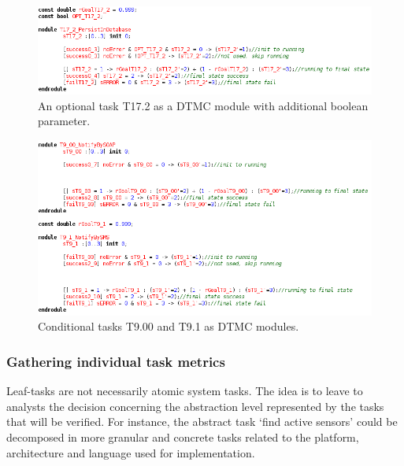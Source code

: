 \begin{figure}[ht]
\centering
\includegraphics[width=1\textwidth]{imgs/PRISM_OPT_TSK.png}
\caption{An optional task T17.2 as a DTMC module with additional boolean parameter.}
\label{fig:PRISM_OPT_TSK}
\end{figure}

\begin{figure}[ht]
\centering
\includegraphics[width=1\textwidth]{imgs/PRISM_TRY_TSKS.png}
\caption{Conditional tasks T9.00 and T9.1 as DTMC modules.}
\label{fig:PRISM_TRY_TSKS}
\end{figure}



\subsubsection{Gathering individual task metrics}

Leaf-tasks are not necessarily atomic system tasks. The idea is to leave to analysts the decision concerning the abstraction level represented by the tasks that will be verified. For instance, the abstract task `find active sensors' could be decomposed in more granular and concrete tasks related to the platform, architecture and language used for implementation. 

